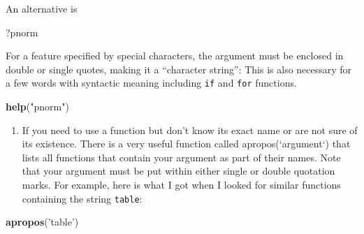 \documentclass[]{book}
\newenvironment{Shaded}{\begin{snugshade}}{\end{snugshade}}
\newcommand{\KeywordTok}[1]{\textcolor[rgb]{0.13,0.29,0.53}{\textbf{#1}}}
\newcommand{\StringTok}[1]{\textcolor[rgb]{0.31,0.60,0.02}{#1}}
\newcommand{\NormalTok}[1]{#1}
\providecommand{\tightlist}{%
  \setlength{\itemsep}{0pt}\setlength{\parskip}{0pt}}
\begin{document}
An alternative is

\begin{Shaded}
\begin{Highlighting}[]
\NormalTok{?pnorm}
\end{Highlighting}
\end{Shaded}

For a feature specified by special characters, the argument must be
enclosed in double or single quotes, making it a ``character string'':
This is also necessary for a few words with syntactic meaning including
\texttt{if} and \texttt{for} functions.

\begin{Shaded}
\begin{Highlighting}[]
\KeywordTok{help}\NormalTok{(}\StringTok{"pnorm"}\NormalTok{)}
\end{Highlighting}
\end{Shaded}

\begin{enumerate}
\def\labelenumi{\arabic{enumi}.}
\setcounter{enumi}{2}
\tightlist
\item
  If you need to use a function but don't know its exact name or are not
  sure of its existence. There is a very useful function called
  apropos(`argument`) that lists all functions that contain your
  argument as part of their names. Note that your argument must be put
  within either single or double quotation marks. For example, here is
  what I got when I looked for similar functions containing the string
  \texttt{table}:
\end{enumerate}

\begin{Shaded}
\begin{Highlighting}[]
\KeywordTok{apropos}\NormalTok{(}\StringTok{'table'}\NormalTok{)}
\end{Highlighting}
\end{Shaded}
\end{document}
